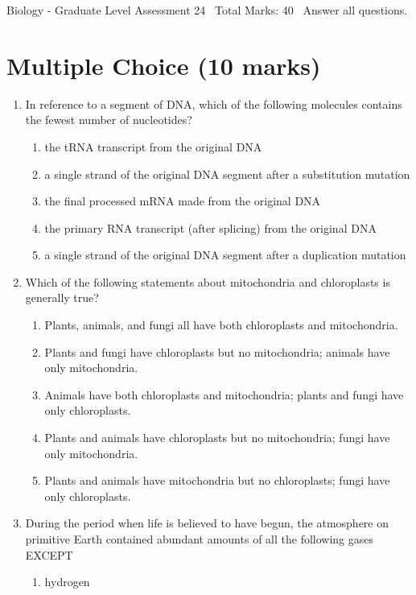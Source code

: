 \documentclass[12pt]{article}
\begin{document}
\begin{center}
Biology - Graduate Level Assessment 24 \
Total Marks: 40 \
Answer all questions.
\end{center}

\section*{Multiple Choice (10 marks)}
\begin{enumerate}[label=\arabic*.]
\item In reference to a segment of DNA, which of the following molecules contains the fewest number of nucleotides?
\begin{enumerate}[label=(\alph*)]
    \item the tRNA transcript from the original DNA
    \item a single strand of the original DNA segment after a substitution mutation
    \item the final processed mRNA made from the original DNA
    \item the primary RNA transcript (after splicing) from the original DNA
    \item a single strand of the original DNA segment after a duplication mutation
\end{enumerate}
\item Which of the following statements about mitochondria and chloroplasts is generally true?
\begin{enumerate}[label=(\alph*)]
    \item Plants, animals, and fungi all have both chloroplasts and mitochondria.
    \item Plants and fungi have chloroplasts but no mitochondria; animals have only mitochondria.
    \item Animals have both chloroplasts and mitochondria; plants and fungi have only chloroplasts.
    \item Plants and animals have chloroplasts but no mitochondria; fungi have only mitochondria.
    \item Plants and animals have mitochondria but no chloroplasts; fungi have only chloroplasts.
\end{enumerate}
\item During the period when life is believed to have begun, the atmosphere on primitive Earth contained abundant amounts of all the following gases EXCEPT
\begin{enumerate}[label=(\alph*)]
    \item hydrogen

\end{enumerate}
\end{enumerate}
\end{document}
